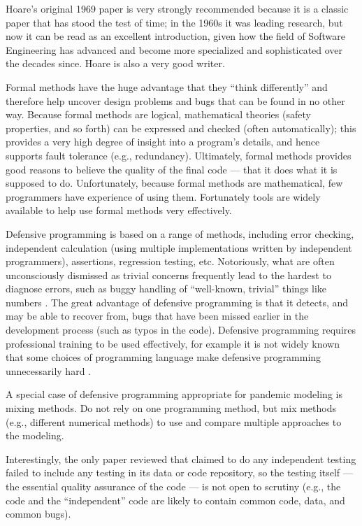 \documentclass[10pt,a4paper]{article}
\begin{document}
Hoare's original 1969 paper \cite{hoare} is very strongly recommended because it is a classic paper that has stood the test of time; in the 1960s it was leading research, but now it can be read as an excellent introduction, given how the field of Software Engineering has advanced and become more specialized and sophisticated over the decades since. Hoare is also a very good writer.

Formal methods have the huge advantage that they ``think differently'' and therefore help uncover design problems and bugs that can be found in no other way. Because formal methods are logical, mathematical theories (safety properties, and so forth) can be expressed and checked (often automatically); this provides a very high degree of insight into a program's details, and hence supports fault tolerance (e.g., redundancy). Ultimately, formal methods provides good reasons to believe the quality of the final code --- that it does what it is supposed to do. Unfortunately, because formal methods are mathematical, few programmers have experience of using them. Fortunately tools are widely available to help use formal methods very effectively.

 Defensive programming is based on a range of methods, including error checking, independent calculation (using multiple implementations written by independent programmers), assertions, regression testing, etc. Notoriously, what are often unconsciously dismissed as trivial concerns frequently lead to the hardest to diagnose errors, such as buggy handling of ``well-known, trivial'' things like numbers \cite{numerals}. The great advantage of defensive programming is that it detects, and may be able to recover from, bugs that have been missed earlier in the development process (such as typos in the code). Defensive programming requires professional training to be used effectively, for example it is not widely known that some choices of programming language make defensive programming unnecessarily hard \cite{heedless}.

A special case of defensive programming appropriate for pandemic modeling is mixing methods. Do not rely on one programming method, but mix methods (e.g., different numerical methods) to use and compare multiple approaches to the modeling.

Interestingly, the only paper reviewed that claimed to do any independent testing \cite{onlyPaperWithChecks} failed to include any testing in its data or code repository, so the testing itself --- the essential quality assurance of the code --- is not open to scrutiny (e.g., the code and the ``independent'' code are likely to contain common code, data, and common bugs).
\end{document}
